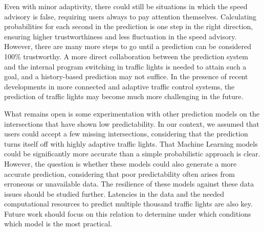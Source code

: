 Even with minor adaptivity, there could still be situations in which the speed advisory is false, requiring users always to pay attention themselves. Calculating probabilities for each second in the prediction is one step in the right direction, ensuring higher trustworthiness and less fluctuation in the speed advisory. However, there are many more steps to go until a prediction can be considered 100\% trustworthy. A more direct collaboration between the prediction system and the internal program switching in traffic lights is needed to attain such a goal, and a history-based prediction may not suffice. In the presence of recent developments in more connected and adaptive traffic control systems, the prediction of traffic lights may become much more challenging in the future.

What remains open is some experimentation with other prediction models on the intersections that have shown low predictability. In our context, we assumed that users could accept a few missing intersections, considering that the prediction turns itself off with highly adaptive traffic lights. That Machine Learning models could be significantly more accurate than a simple probabilistic approach is clear. However, the question is whether these models could also generate a more accurate prediction, considering that poor predictability often arises from erroneous or unavailable data. The resilience of these models against these data issues should be studied further. Latencies in the data and the needed computational resources to predict multiple thousand traffic lights are also key. Future work should focus on this relation to determine under which conditions which model is the most practical.
